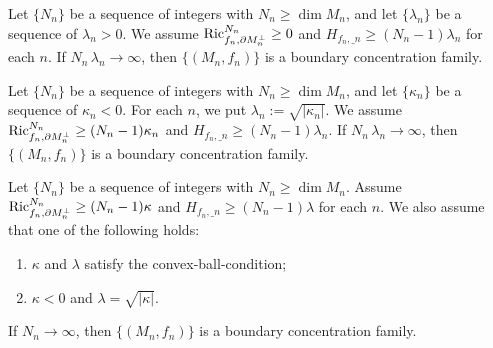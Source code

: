 \begin{cor}
Let $\{N_{n}\}$ be a sequence of integers with $N_{n} \geq \dim M_{n}$,
and let $\{\lambda_{n}\}$ be a sequence of $\lambda_{n}>0$.
We assume $\operatorname{Ric}^{N_{n}}_{f_{n},\partial M_{n}^{\perp}}\geq 0$ and $H_{f_{n},\bm_{n}}\geq (N_{n}-1)\lambda_{n}$ for each $n$.
If $N_{n}\,\lambda_{n}\to \infty$,
then $\{(M_{n},f_{n})\}$ is a boundary concentration family.
\end{cor}

\begin{cor}\label{cor:finite dimensional corollary}
Let $\{N_{n}\}$ be a sequence of integers with $N_{n} \geq \dim M_{n}$,
and let $\{\kappa_{n}\}$ be a sequence of $\kappa_{n}<0$.
For each $n$,
we put $\lambda_{n}:=\sqrt{\vert \kappa_{n} \vert}$.
We assume $\operatorname{Ric}^{N_{n}}_{f_{n},\partial M_{n}^{\perp}}\geq (N_{n}-1)\kappa_{n}$ and $H_{f_{n},\bm_{n}}\geq (N_{n}-1)\lambda_{n}$.
If $N_{n}\,\lambda_{n}\to \infty$,
then $\{(M_{n},f_{n})\}$ is a boundary concentration family.
\end{cor}

\begin{cor}
Let $\{N_{n}\}$ be a sequence of integers with $N_{n} \geq \dim M_{n}$.
Assume $\operatorname{Ric}^{N_{n}}_{f_{n},\partial M_{n}^{\perp}}\geq (N_{n}-1)\kappa$ and $H_{f_{n},\bm_{n}}\geq (N_{n}-1)\lambda$ for each $n$.
We also assume that
one of the following holds:
\begin{enumerate}
\item $\kappa$ and $\lambda$ satisfy the convex-ball-condition;
\item $\kappa<0$ and $\lambda=\sqrt{\vert \kappa \vert}$.
\end{enumerate}
If $N_{n}\to \infty$,
then $\{(M_{n},f_{n})\}$ is a boundary concentration family.
\end{cor}

